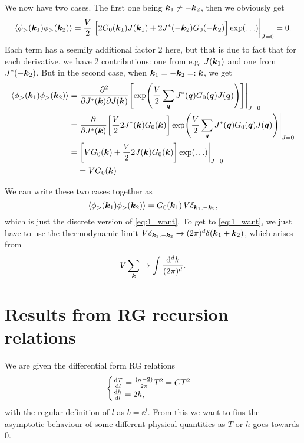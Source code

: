 \documentclass[11pt,letter, swedish, english
]{article}
\begin{document}
We now have two cases. The first one being $\vb*k_1\neq-\vb*k_2$, then
we obviously get
\begin{equation}
\begin{aligned}
\ev{\phi_>(\vb*k_1)\phi_>(\vb*k_2)} 
= \frac{V}{2}\eval{\Big[
2G_0(\vb*k_1)J(\vb*k_1) + 2J^*(-\vb*k_2)G_0(-\vb*k_2)
\Big]\exp(\ldots)}_{J=0} = 0.
\end{aligned}
\end{equation}
Each term has a seemily additional factor 2 here, but that is due to
fact that for each derivative, we have 2 contributions: one from e.g.
$J(\vb*k_1)$ and one from $J^*(-\vb*k_2)$.
But in the second case, when $\vb*k_1=-\vb*k_2=:\vb*k$, we get
\begin{equation}
\begin{aligned}
\ev{\phi_>(\vb*k_1)\phi_>(\vb*k_2)} 
=&\eval{\pdv[2]{}{J^*(\vb*k)}{J(\vb*k)}
\qty[\exp(\frac{V}{2} \sum_{\vb*q}
J^*(\vb*q)G_0(\vb*q)J(\vb*q))]}_{J=0}\\
=&\eval{\pdv{J^*(\vb*k)}\qty[\frac{V}{2} 
2J^*(\vb*k)G_0(\vb*k)]\exp(\frac{V}{2} \sum_{\vb*q}
J^*(\vb*q)G_0(\vb*q)J(\vb*q))
}_{J=0}\\
=&\eval{\qty[VG_0(\vb*k) + \frac{V}{2} 
2J(\vb*k)G_0(\vb*k)]\exp(\ldots)
}_{J=0}\\
&=VG_0(\vb*k)
\end{aligned}
\end{equation}

We can write these two cases together as
\begin{equation}
\ev{\phi_>(\vb*k_1)\phi_>(\vb*k_2)} 
=G_0(\vb*k_1) \,V\delta_{\vb*k_1, -\vb*k_2},
\end{equation}
which is just the discrete version of \eqref{eq:1_want}. To get to
\eqref{eq:1_want}, we just have to use the thermo\-dynamic limit
$V\delta_{\vb*k_1, -\vb*k_2} \to (2\pi)^d\delta(\vb*k_1+\vb*k_2)$,
which arises from 
\begin{equation}
V\sum_{\vb*k} \to \int\frac{\rd^dk}{(2\pi)^d}.
\end{equation}







\section{Results from RG recursion relations}
\newcommand{\TT}{\tilde{T}}
\newcommand{\hT}{\tilde{h}}
\newcommand{\fs}{f_{\text{s}}}
We are given the differential form RG relations
\begin{equation}\label{eq:2_RG}
\begin{cases}
\dv{T}{l} = \frac{(n-2)}{2\pi}T^2 = CT^2\\
\dv{h}{l} = 2h,
\end{cases}
\end{equation}
with the regular definition of $l$ as $b=\ee^l$. From this we want to
fins the asymptotic behaviour of some different physical quantities as
$T$ or $h$ goes towards $0$.  
\end{document}
